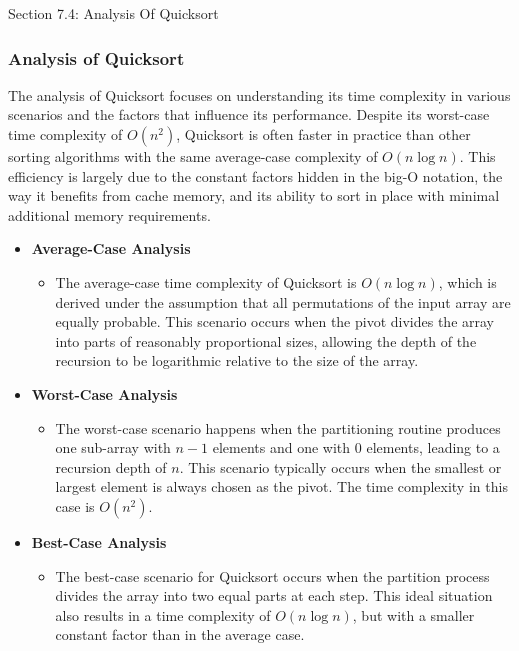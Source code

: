 \begin{notes}{Section 7.4: Analysis Of Quicksort}
    \subsubsection*{Analysis of Quicksort}

    The analysis of Quicksort focuses on understanding its time complexity in various scenarios and the factors that influence its performance. Despite its worst-case time complexity of $O(n^2)$, 
    Quicksort is often faster in practice than other sorting algorithms with the same average-case complexity of $O(n \log n)$. This efficiency is largely due to the constant factors hidden in the 
    big-O notation, the way it benefits from cache memory, and its ability to sort in place with minimal additional memory requirements.
    
    \begin{itemize}
        \item \textbf{Average-Case Analysis}
        \begin{itemize}
            \item The average-case time complexity of Quicksort is $O(n \log n)$, which is derived under the assumption that all permutations of the input array are equally probable. This scenario 
            occurs when the pivot divides the array into parts of reasonably proportional sizes, allowing the depth of the recursion to be logarithmic relative to the size of the array.
        \end{itemize}
        
        \item \textbf{Worst-Case Analysis}
        \begin{itemize}
            \item The worst-case scenario happens when the partitioning routine produces one sub-array with $n-1$ elements and one with $0$ elements, leading to a recursion depth of $n$. This scenario 
            typically occurs when the smallest or largest element is always chosen as the pivot. The time complexity in this case is $O(n^2)$.
        \end{itemize}
        
        \item \textbf{Best-Case Analysis}
        \begin{itemize}
            \item The best-case scenario for Quicksort occurs when the partition process divides the array into two equal parts at each step. This ideal situation also results in a time complexity of 
            $O(n \log n)$, but with a smaller constant factor than in the average case.
        \end{itemize}
        

\end{itemize}
\end{notes}
